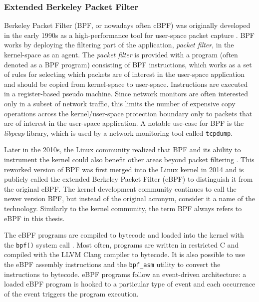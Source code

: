 \documentclass[english, 12pt, a4paper, sci, utf8, a-2b, online]{aaltothesis}
\begin{document}
\subsubsection{Extended Berkeley Packet Filter}

Berkeley Packet Filter (BPF, or nowadays often cBPF) was originally developed in the early 1990s as a high-performance tool for user-space packet capture \cite{mccanne1993bsd}.
BPF works by deploying the filtering part of the application, \emph{packet filter}, in the kernel-space as an agent.
The \emph{packet filter} is provided with a program (often denoted as a BPF program) consisting of BPF instructions, which works as a set of rules for selecting which packets are of interest in the user-space application and should be copied from kernel-space to user-space.
Instructions are executed in a register-based pseudo machine.
Since network monitors are often interested only in a subset of network traffic, this limits the number of expensive copy operations across the kernel/user-space protection boundary only to packets that are of interest in the user-space application.
A notable use-case for BPF is the \emph{libpcap} library, which is used by a network monitoring tool called \lstinline{tcpdump}.

Later in the 2010s, the Linux community realized that BPF and its ability to instrument the kernel could also benefit other areas beyond packet filtering \cite{vieira2020fast}.
This reworked version of BPF was first merged into the Linux kernel in 2014 and is publicly called the extended Berkeley Packet Filter (eBPF) to distinguish it from the original cBPF.
The kernel development community continues to call the newer version BPF, but instead of the original acronym, consider it a name of the technology.
Similarly to the kernel community, the term BPF always refers to eBPF in this thesis.

The eBPF programs are compiled to bytecode and loaded into the kernel with the \lstinline{bpf()} system call \cite{miano2021framework}.
Most often, programs are written in restricted C and compiled with the LLVM Clang compiler to bytecode.
It is also possible to use the eBPF assembly instructions and the \lstinline{bpf_asm} utility to convert the instructions to bytecode.
eBPF programs follow an event-driven architecture: a loaded eBPF program is hooked to a particular type of event and each occurrence of the event triggers the program execution.
\end{document}

